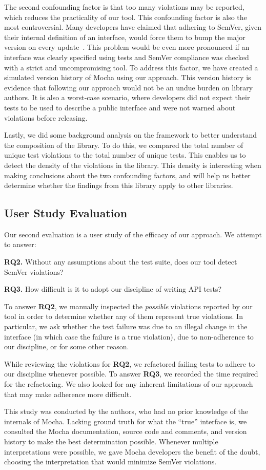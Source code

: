 The second confounding factor is that too many violations may be
reported, which reduces the practicality of our tool. This
confounding factor is also the most controversial. Many developers
have claimed that adhering to SemVer, given their internal definition
of an interface, would force them to bump the major version on every
update~\cite{backbone-2888,exoplayer-1382,crawford-not-semver}. This
problem would be even more pronounced if an interface was clearly
specified using tests and SemVer compliance was checked with a strict
and uncompromising tool. To address this factor, we have created a
simulated version history of Mocha using our approach. This version
history is evidence that following our approach would not be an undue
burden on library authors. It is also a worst-case scenario, where
developers did not expect their tests to be used to describe a public
interface and were not warned about violations before releasing.

Lastly, we did some background analysis on the framework to better
understand the composition of the library. To do this, we compared the
total number of unique test violations to the total number of unique
tests. This enables us to detect the density of the violations in the
library. This density is interesting when making conclusions about
the two confounding factors, and will help us better determine
whether the findings from this library apply to other libraries.

\subsection{User Study Evaluation}
Our second evaluation is a user study of the efficacy of our
approach. We attempt to answer: 

{\bf RQ2.} Without any assumptions about the test suite, does our tool
detect SemVer violations?

{\bf RQ3.} How difficult is it to adopt our discipline of writing API
tests?

To answer {\bf RQ2}, we manually inspected the {\em possible} 
violations reported by our tool in order to determine whether any of
them represent true violations. In particular, we ask whether the test
failure was due to an illegal change in the interface (in which case
the failure is a true violation), due to non-adherence to our
discipline, or for some other reason.

While reviewing the violations for {\bf RQ2}, we refactored failing
tests to adhere to our discipline whenever possible. To answer {\bf
  RQ3}, we recorded the time required for the refactoring. We also
looked for any inherent limitations of our approach that may make
adherence more difficult.

This study was conducted by the authors, who had no prior knowledge of
the internals of Mocha. Lacking ground truth for what the ``true''
interface is, we consulted the Mocha documentation, source code and
comments, and version history to make the best determination
possible. Whenever multiple interpretations were possible, we gave
Mocha developers the benefit of the doubt, choosing the interpretation
that would minimize SemVer violations.

